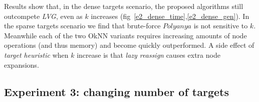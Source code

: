 


Results show that, in the dense targets scenario, the proposed algorithms still outcompete \textit{LVG}, even as $k$ increases (fig~\ref{e2_dense_time},\ref{e2_dense_gen}). In the sparse targets scenario we find that brute-force $Polyanya$ is not sensitive to $k$. Meanwhile each of the two OkNN variants requires increasing amounts of node operations (and thus memory) and become quickly outperformed. A side effect of \textit{target heuristic} when $k$ increase is that \textit{lazy reassign} causes extra node expansions.

\subsection{Experiment 3: changing number of targets}

